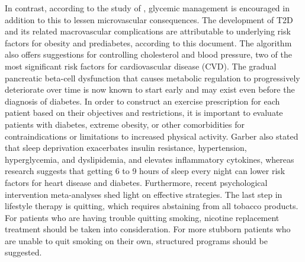 In contrast, according to the study of \textcite{garber-2017}, glycemic
management is encouraged in addition to this to lessen microvascular
consequences. The development of T2D and its related macrovascular complications
are attributable to underlying risk factors for obesity and prediabetes,
according to this document. The algorithm also offers suggestions for
controlling cholesterol and blood pressure, two of the most significant risk
factors for cardiovascular disease (CVD). The gradual pancreatic beta-cell
dysfunction that causes metabolic regulation to progressively deteriorate over
time is now known to start early and may exist even before the diagnosis of
diabetes. In order to construct an exercise prescription for each patient based
on their objectives and restrictions, it is important to evaluate patients with
diabetes, extreme obesity, or other comorbidities for contraindications or
limitations to increased physical activity. Garber also stated that sleep
deprivation exacerbates insulin resistance, hypertension, hyperglycemia, and
dyslipidemia, and elevates inflammatory cytokines, whereas research suggests
that getting 6 to 9 hours of sleep every night can lower risk factors for heart
disease and diabetes. Furthermore, recent psychological intervention
meta-analyses shed light on effective strategies. The last step in lifestyle
therapy is quitting, which requires abstaining from all tobacco products. For
patients who are having trouble quitting smoking, nicotine replacement treatment
should be taken into consideration. For more stubborn patients who are unable to
quit smoking on their own, structured programs should be suggested.
